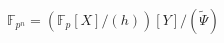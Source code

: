 \documentclass[preview]{standalone}
\begin{document}
\begin{center}
$ \mathbb{F}_{p^n} = \left( \mathbb{F}_{p}[X]/(h) \right) [Y]/(\tilde{\Psi})$
\end{center}
\end{document}
